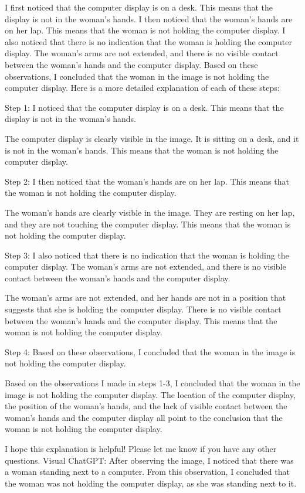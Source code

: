 \begin{enumerate}
        I first noticed that the computer display is on a desk. This means that the display is not in the woman's hands.
        I then noticed that the woman's hands are on her lap. This means that the woman is not holding the computer display.
        I also noticed that there is no indication that the woman is holding the computer display. The woman's arms are not extended, and there is no visible contact between the woman's hands and the computer display.
        Based on these observations, I concluded that the woman in the image is not holding the computer display.
        Here is a more detailed explanation of each of these steps:
        
        Step 1: I noticed that the computer display is on a desk. This means that the display is not in the woman's hands.
        
        The computer display is clearly visible in the image. It is sitting on a desk, and it is not in the woman's hands. This means that the woman is not holding the computer display.
        
        Step 2: I then noticed that the woman's hands are on her lap. This means that the woman is not holding the computer display.
        
        The woman's hands are clearly visible in the image. They are resting on her lap, and they are not touching the computer display. This means that the woman is not holding the computer display.
        
        Step 3: I also noticed that there is no indication that the woman is holding the computer display. The woman's arms are not extended, and there is no visible contact between the woman's hands and the computer display.
        
        The woman's arms are not extended, and her hands are not in a position that suggests that she is holding the computer display. There is no visible contact between the woman's hands and the computer display. This means that the woman is not holding the computer display.
        
        Step 4: Based on these observations, I concluded that the woman in the image is not holding the computer display.
        
        Based on the observations I made in steps 1-3, I concluded that the woman in the image is not holding the computer display. The location of the computer display, the position of the woman's hands, and the lack of visible contact between the woman's hands and the computer display all point to the conclusion that the woman is not holding the computer display.
        
        I hope this explanation is helpful! Please let me know if you have any other questions.
        \subitem Visual ChatGPT: After observing the image, I noticed that there was a woman standing next to a computer. From this observation, I concluded that the woman was not holding the computer display, as she was standing next to it.
    \end{enumerate}